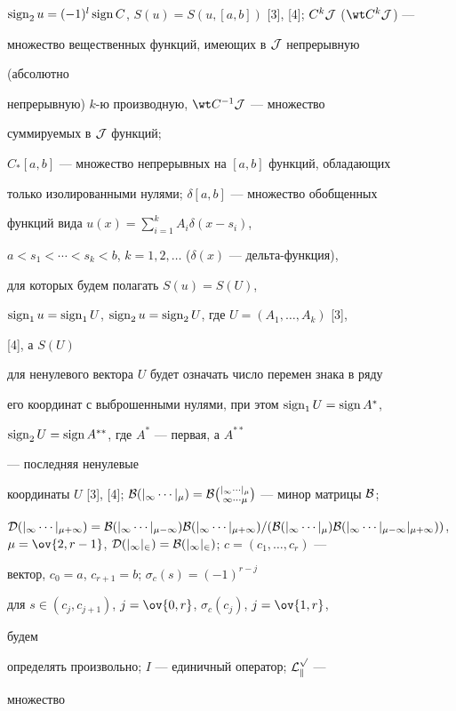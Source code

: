$\sign_2u=(-1)^l\sign C$, $S(u)=S(u,[a,b])$ [3], [4]; $C^k\cal J$ ($\wt 


C^k\cal J$) --- 


множество вещественных функций, имеющих в $\cal J$ непрерывную 


(абсолютно 


непрерывную) $k$-ю производную, $\wt C^{-1}\cal J$ --- множество 


суммируемых в $\cal J$ функций; 


$C_*[a,b]$ --- множество непрерывных на $[a,b]$ функций, обладающих 


только изолированными нулями; $\delta[a,b]$ --- множество обобщенных 


функций вида $u(x)=\sum\limits^k_{i=1}A_i\delta(x-s_i)$, 


$a<s_1<\dotsb<s_k<b$, $k=1,2,\dotsc$ ($\delta(x)$ --- дельта-функция), 


для которых будем полагать $S(u)=S(U)$, 


$\operatorname{sign}_1u=\operatorname{sign}_1U$, $\operatorname{sign}_2u=\operatorname{sign}_2U$, где $U=(A_1,\dotsc,A_k)$ [3], 


[4], а $S(U)$ 


для ненулевого вектора $U$ будет означать число перемен знака в ряду 


его координат с выброшенными нулями, при этом $\operatorname{sign}_1U=\operatorname{sign}{}A^*$, 


$\operatorname{sign}_2U=\operatorname{sign}{}A^{**}$, где $A^*$ --- первая, а $A^{**}$ 


--- последняя ненулевые


координаты $U$ [3], [4]; $\cal B(j_1\dotsb j_\mu)=\cal 


B\binom{j_1\dotsb j_\mu}{1\dotsb\mu}$ --- минор матрицы $\cal B$; 


$\cal D(j_1\dotsb j_{\mu+1})=\cal B(j_1\dotsb j_{\mu-1})\cal B(j_1\dotsb 


j_{\mu+1})/(\cal B(j_1\dotsb j_\mu)\cal B(j_1\dotsb 


j_{\mu-1}j_{\mu+1}))$, $\mu=\ov{2,r-1}$, $\cal D(j_1j_2)=\cal 


B(j_1j_2)$; $c=(c_1,\dotsc,c_r)$ --- 


вектор, $c_0=a$, $c_{r+1}=b$; $\sigma_c(s)=(-1)^{r-j}$ 


для $s\in(c_j,c_{j+1})$, $j=\ov{0,r}$, $\sigma_c(c_j)$, $j=\ov{1,r}$, 


будем 


определять произвольно; $I$ --- единичный оператор; $\cal L^p_k$ --- 


множество 



